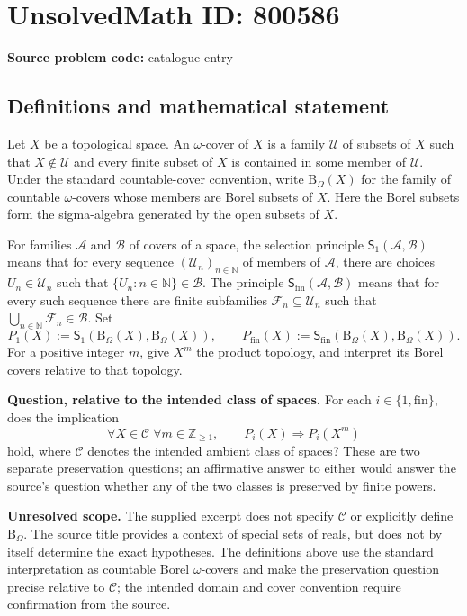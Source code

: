 \documentclass[11pt]{article}
\newcommand{\N}{\mathbb{N}}
\newcommand{\Z}{\mathbb{Z}}
\begin{document}
\section*{UnsolvedMath ID: 800586}
\textbf{Source problem code:} catalogue entry
\subsection{Definitions and mathematical statement}
Let \(X\) be a topological space. An \(\omega\)-cover of \(X\) is a family \(\mathcal U\) of subsets of \(X\) such that \(X\notin\mathcal U\) and every finite subset of \(X\) is contained in some member of \(\mathcal U\). Under the standard countable-cover convention, write \(\mathrm B_\Omega(X)\) for the family of countable \(\omega\)-covers whose members are Borel subsets of \(X\). Here the Borel subsets form the sigma-algebra generated by the open subsets of \(X\).

For families \(\mathcal A\) and \(\mathcal B\) of covers of a space, the selection principle \(\mathsf S_1(\mathcal A,\mathcal B)\) means that for every sequence \((\mathcal U_n)_{n\in\N}\) of members of \(\mathcal A\), there are choices \(U_n\in\mathcal U_n\) such that \(\{U_n:n\in\N\}\in\mathcal B\). The principle \(\mathsf S_{\mathrm{fin}}(\mathcal A,\mathcal B)\) means that for every such sequence there are finite subfamilies \(\mathcal F_n\subseteq\mathcal U_n\) such that \(\bigcup_{n\in\N}\mathcal F_n\in\mathcal B\). Set
\[
P_1(X):=\mathsf S_1(\mathrm B_\Omega(X),\mathrm B_\Omega(X)),\qquad
P_{\mathrm{fin}}(X):=\mathsf S_{\mathrm{fin}}(\mathrm B_\Omega(X),\mathrm B_\Omega(X)).
\]
For a positive integer \(m\), give \(X^m\) the product topology, and interpret its Borel covers relative to that topology.

\textbf{Question, relative to the intended class of spaces.} For each \(i\in\{1,\mathrm{fin}\}\), does the implication
\[
\forall X\in\mathcal C\;\forall m\in\Z_{\geq1},\qquad
P_i(X)\Longrightarrow P_i(X^m)
\]
hold, where \(\mathcal C\) denotes the intended ambient class of spaces? These are two separate preservation questions; an affirmative answer to either would answer the source's question whether any of the two classes is preserved by finite powers.

\textbf{Unresolved scope.} The supplied excerpt does not specify \(\mathcal C\) or explicitly define \(\mathrm B_\Omega\). The source title provides a context of special sets of reals, but does not by itself determine the exact hypotheses. The definitions above use the standard interpretation as countable Borel \(\omega\)-covers and make the preservation question precise relative to \(\mathcal C\); the intended domain and cover convention require confirmation from the source.
\end{document}
